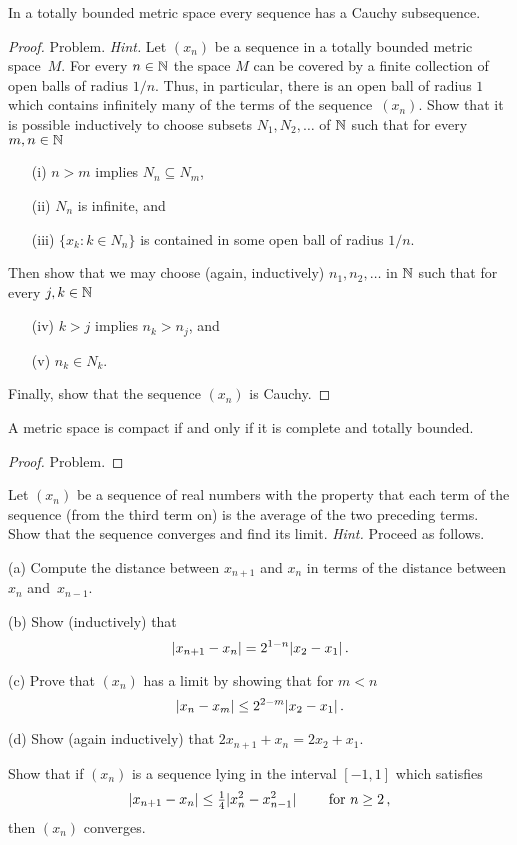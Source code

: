 \begin{prop} In a totally bounded metric space every sequence has a Cauchy subsequence.
\end{prop}

\begin{proof} Problem.  \emph{Hint.}  Let $(x_n)$ be a sequence in a totally bounded metric
space~$M$.  For every $n \in \mathbb{N}$ the space $M$ can be covered by a finite collection of open
balls of radius $1/n$.  Thus, in particular, there is an open ball of radius $1$ which
contains infinitely many of the terms of the sequence~$(x_n)$.  Show that it is possible
inductively to choose subsets $N_1, N_2, \dots$ of $\mathbb{N}$ such that for every $m,n \in \mathbb{N}$
 \begin{enumerate}
  \item[(i)] $n > m$ implies $N_n \subseteq N_m$,
  \item[(ii)] $N_n$ is infinite, and
  \item[(iii)] $\{x_k: k \in N_n\}$ is contained in some open ball of
radius $1/n$.
 \end{enumerate}
Then show that we may choose (again, inductively) $n_1, n_2, \dots$
in $\mathbb{N}$ such that for every $j,k \in \mathbb{N}$
 \begin{enumerate}
  \item[(iv)] $k > j$ implies $n_k > n_j$, and
  \item[(v)] $n_k \in N_k$.
 \end{enumerate}
Finally, show that the sequence $(x_n)$ is Cauchy.   \ns
\end{proof}

\begin{prop} A metric space is compact if and only if it is complete and totally bounded.
\end{prop}

\begin{proof} Problem.   \ns   \end{proof}

\begin{prob}  Let $(x_n)$ be a sequence of real numbers with the property that each term of
the sequence (from the third term on) is the average of the two preceding terms.  Show that
the sequence converges and find its limit.  \emph{Hint.}  Proceed as follows.

(a) Compute the distance between $x_{n+1}$ and $x_n$ in terms of the distance between $x_n$
and~$x_{n-1}$.

(b) Show (inductively) that
   \[ \lvert x_{n+1} - x_n\rvert = 2^{1-n}\lvert x_2 - x_1\rvert\,. \]

(c) Prove that $(x_n)$ has a limit by showing that for $m < n$
   \[ \lvert x_n - x_m\rvert \le 2^{2-m}\lvert x_2 - x_1\rvert\,. \]

(d)  Show (again inductively) that $2x_{n+1} + x_n = 2x_2 + x_1$.
\end{prob}

\begin{prob} Show that if $(x_n)$ is a sequence lying in the
interval $[-1,1]$ which satisfies
   \[ \lvert x_{n+1} - x_n\rvert \le \tfrac14 \lvert x_n^2 - x_{n-1}^2\rvert \qquad\text{ for $n \ge 2$}\,, \]
then $(x_n)$ converges.
\end{prob}





\endinput
